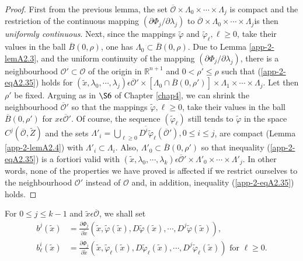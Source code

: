 \begin{proof}
First from the previous lemma, the set $\overline{\mathscr{O}} \times
\Lambda_{0} \times \cdots \times \Lambda_{j}$ is compact and the
restriction of the continuous mapping $(\partial \Phi_{j} / \partial
\lambda_{j})$ to $\overline{\mathscr{O}} \times \Lambda_{0} \times
\cdots \times \Lambda_{j}$\pageoriginale is then {\em uniformly
  continuous}. Next, since the mappings $\widetilde{\varphi}$ and
$\widetilde{\varphi}_{\ell}, \ell \geq 0$, take their values in the
ball $\overline{B}(0, \rho)$, one has $\Lambda_{0} \subset
\overline{B}(0, \rho)$. Due to Lemma \ref{app-2-lemA2.3}, and the uniform continuity
of the mapping $(\partial \Phi_{j} / \partial \lambda_{j})$, there is
a neighbourhood $\mathscr{O}' \subset \mathscr{O}$ of the origin in
$\mathbb{R}^{n+1}$ and $0 < \rho' \leq \rho$ such that (\ref{app-2-eqA2.35}) holds
for
$(\widetilde{x}, \lambda_{0}, \cdots, \lambda_{j}) \epsilon
\overline{\mathscr{O}}' \times \left[\Lambda_{0} \cap \overline{B} (0,
  \rho')\right] \times \Lambda_{1} \times \cdots \times
\Lambda_{j}$. Let then $\rho'$ be fixed. Arguing as in $\S 6$ of
Chapter \ref{chap4}, we can shrink the neighbourhood
$\overline{\mathscr{O}}'$ so that the mappings $\widetilde{\varphi},
\ell \geq 0$, take their values in the ball $\overline{B}(0, \rho')$
for $x \epsilon \overline{\mathscr{O}}'$. Of course, the sequence
$(\widetilde{\varphi}_{\ell})$ still tends to $\widetilde{\varphi}$ in
the space $C^{j}(\overline{\mathscr{O}}, \widetilde{Z})$ and the sets
$\Lambda'_{i} = \overline{\bigcup\limits_{\ell \geq 0}
  D^{i}\widetilde{\varphi}_{\ell} (\overline{\mathscr{O}}')}, 0 \leq i
\leq j$, are compact (Lemma \ref{app-2-lemA2.4}) with $\Lambda'_{i} \subset
\Lambda_{i}$. Also, $\Lambda'_{0} \subset \overline{B}(0, \rho')$ so
that inequality (\ref{app-2-eqA2.35}) is a fortiori valid with $(\widetilde{x},
\lambda_{0}, \cdots, \lambda_{k}) \epsilon \overline{\mathscr{O}}'
\times \Lambda'_{0} \times \cdots \times \Lambda'_{j}$. In other
words, none of the properties we have proved is affected if we
restrict ourselves to the neighbourhood $\mathscr{O}'$ instead of
$\mathscr{O}$ and, in addition, inequality (\ref{app-2-eqA2.35}) holds.
\end{proof}

For $0 \leq j \leq k-1$ and $\widetilde{x} \epsilon
\overline{\mathscr{O}}$, we shall set
\begin{align*}
b^{j}(\widetilde{x}) & = \frac{\partial \Phi_{j}}{\partial
  \widetilde{x}} (\widetilde{x}, \widetilde{\varphi}(\widetilde{x}),
D\widetilde{\varphi}(\widetilde{x}), \cdots,
D^{j}\widetilde{\varphi}(\widetilde{x})),\tag{A2.36}\label{app-2-eqA2.36}\\
b_{\ell}^{i}(\widetilde{x}) & = \frac{\partial \Phi_{j}}{\partial
  \widetilde{x}} (\widetilde{x}, \widetilde{\varphi}_{\ell}
(\widetilde{x}), D\widetilde{\varphi}_{\ell}(\widetilde{x}), \cdots,
D^{j}\widetilde{\varphi}_{\ell}(\widetilde{x})) \text{ for } \ell \geq
0.\tag{A2.37} \label{app-2-eqA2.37}
\end{align*}

